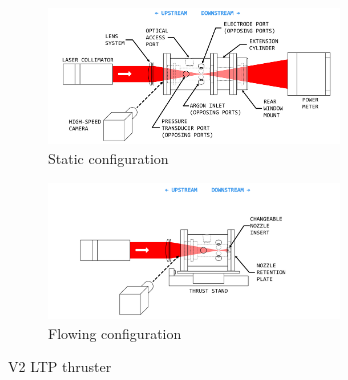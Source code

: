             \begin{figure}[!ht]
                \centering
                \begin{subfigure}[t]{\textwidth}
                    \centering
                    \includegraphics[width=0.85\textwidth]{assets/3 design/V2 Static config.pdf}
                    \caption{Static configuration}
                \end{subfigure}
                \hfill
                \begin{subfigure}[t]{\textwidth}
                    \centering
                    \includegraphics[width=0.85\textwidth]{assets/3 design/V2 Flowing config.pdf}
                    \caption{Flowing configuration}
                \end{subfigure}
                \caption{V2 LTP thruster}
                \label{fig:V2 setup}
            \end{figure}

